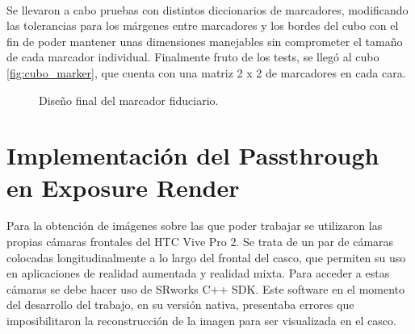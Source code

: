 \paragraph{}
Se llevaron a cabo pruebas con distintos diccionarios de marcadores, modificando las tolerancias para los márgenes entre marcadores y los bordes del cubo con el fin de poder mantener unas dimensiones manejables sin comprometer el tamaño de cada marcador individual.
Finalmente fruto de los tests, se llegó al cubo \ref{fig:cubo_marker},
que cuenta con una matriz 2 x 2 de marcadores en cada cara.

\begin{figure}%
    \centering
    \qquad
    \caption{Diseño final del marcador fiduciario.}%
    \label{fig:3dslier}%
\end{figure}


\section{Implementación del Passthrough en Exposure Render}
Para la obtención de imágenes sobre las que poder trabajar se utilizaron las propias cámaras frontales del HTC Vive Pro 2. Se trata de un par de cámaras colocadas longitudinalmente a lo largo del frontal del casco, que permiten su uso en aplicaciones de realidad aumentada y realidad mixta. 
Para acceder a estas cámaras se debe hacer uso de SRworks C++ SDK. Este software en el momento del desarrollo del trabajo, en su versión nativa, presentaba errores que imposibilitaron la reconstrucción de la imagen para ser visualizada en el casco.
